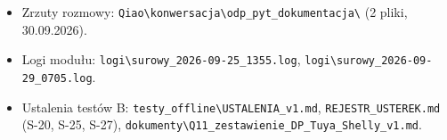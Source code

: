 \documentclass[11pt,a4paper]{article}
\begin{document}
\begin{itemize}
\item Zrzuty rozmowy: \texttt{Qiao\textbackslash{}konwersacja\textbackslash{}odp\_\allowbreak{}pyt\_\allowbreak{}dokumentacja\textbackslash{}} (2 pliki, 30.09.2026).
\item Logi modułu: \texttt{logi\textbackslash{}surowy\_\allowbreak{}2026-\allowbreak{}09-\allowbreak{}25\_\allowbreak{}1355.\allowbreak{}log}, \texttt{logi\textbackslash{}surowy\_\allowbreak{}2026-\allowbreak{}09-\allowbreak{}29\_\allowbreak{}0705.\allowbreak{}log}.
\item Ustalenia testów B: \texttt{testy\_\allowbreak{}offline\textbackslash{}USTALENIA\_\allowbreak{}v1.\allowbreak{}md}, \texttt{REJESTR\_\allowbreak{}USTEREK.\allowbreak{}md} (S-20, S-25, S-27), \texttt{dokumenty\textbackslash{}Q11\_\allowbreak{}zestawienie\_\allowbreak{}DP\_\allowbreak{}Tuya\_\allowbreak{}Shelly\_\allowbreak{}v1.\allowbreak{}md}.
\end{itemize}
\end{document}
